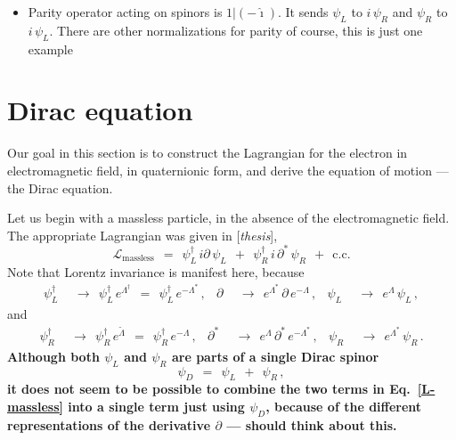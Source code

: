 \documentclass[epsfig,12pt]{article}
\newcommand{\wt}{\widetilde}
\newcommand{\mc}[1]{\mathcal{#1}}
\newcommand{\ii}{\hat\imath}
\begin{document}
\begin{itemize}

\item 
	Parity operator acting on spinors is $ 1 | ( - \ii ) $.
	It sends $ \psi_L $ to $ i\,\psi_R $ and $ \psi_R $ to $ i\,\psi_L $.
	There are other normalizations for parity of course,
	this is just one example

\end{itemize}


\section{Dirac equation}
\label{section-dirac}
\setcounter{equation}{0}

	Our goal in this section is to construct the Lagrangian for the electron in electromagnetic field,
	in quaternionic form, and derive the equation of motion --- the Dirac equation.

	Let us begin with a massless particle, in the absence of the electromagnetic field.
	The appropriate Lagrangian was given in [{\it thesis}],
\begin{equation}
\label{L-massless}
	\mc L_\text{massless}
		~~=~~	\psi_L^\dag\, i\partial\, \psi_L  ~~+~~  \psi_R^\dag\, i\,\partial^*\, \psi_R
			~~+~~  \text{c.c.}
\end{equation}
	Note that Lorentz invariance is manifest here, because
\begin{align}
	\psi_L^\dag	& ~~\to~~	\psi_L^\dag\, e^{\Lambda^\dag}  ~~=~~  \psi_L^\dag\, e^{-\Lambda^*}\,,
	&
	\partial	& ~~\to~~	e^{\Lambda^*}\, \partial\, e^{-\Lambda}\,,
	&
	\psi_L		& ~~\to~~	e^\Lambda\, \psi_L\,,
\end{align}
	and
\begin{align}
	\psi_R^\dag	& ~~\to~~	\psi_R^\dag\, e^{\wt \Lambda}  ~~=~~  \psi_R^\dag\, e^{-\Lambda}\,,
	&
	\partial^*	& ~~\to~~	e^\Lambda\, \partial^*\, e^{-\Lambda^*}\,,
	&
	\psi_R		& ~~\to~~	e^{\Lambda^*}\, \psi_R\,.
\end{align}
{\boldmath\bf
	Although both $ \psi_L $ and $ \psi_R $ are parts of a single Dirac spinor
\begin{equation}
	\psi_D		~~=~~	\psi_L  ~~+~~  \psi_R\,,
\end{equation}
	it does not seem to be possible to combine the two terms in Eq.~\eqref{L-massless}
	into a single term just using $ \psi_D $,
	because of the different representations of the derivative $ \partial $
	---
	should think about this.
}
\end{document}
